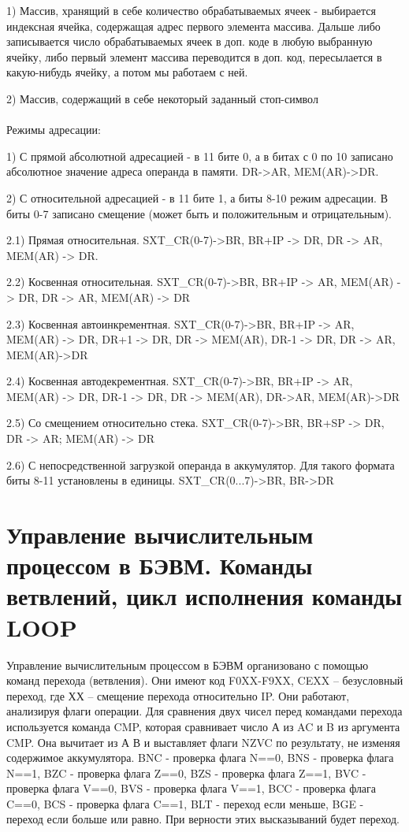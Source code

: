 \documentclass{article}
\begin{document}
1) Массив, хранящий в себе количество обрабатываемых ячеек - выбирается индексная ячейка,
содержащая адрес первого элемента массива. Дальше либо записывается число обрабатываемых
ячеек в доп. коде в любую выбранную ячейку, либо первый элемент массива переводится в доп.
код, пересылается в какую-нибудь ячейку, а потом мы работаем с ней.


2) Массив, содержащий в себе некоторый заданный стоп-символ\\ \\


Режимы адресации:


1) С прямой абсолютной адресацией  - в 11 бите 0, а в битах с 0 по 10 записано абсолютное значение адреса операнда в памяти. DR->AR, MEM(AR)->DR.


2) С относительной адресацией - в 11 бите 1, а биты 8-10 режим адресации. В биты 0-7 записано смещение (может быть и положительным и отрицательным).


2.1) Прямая относительная. SXT\_CR(0-7)->BR, BR+IP -> DR, DR -> AR, MEM(AR) -> DR.


2.2) Косвенная относительная. SXT\_CR(0-7)->BR, BR+IP -> AR, MEM(AR) -> DR, DR -> AR, MEM(AR) -> DR


2.3) Косвенная автоинкрементная. SXT\_CR(0-7)->BR, BR+IP -> AR, MEM(AR) -> DR, DR+1 -> DR, DR -> MEM(AR), DR-1 -> DR, DR -> AR, MEM(AR)->DR


2.4) Косвенная автодекрементная. SXT\_CR(0-7)->BR, BR+IP -> AR, MEM(AR) -> DR, DR-1 -> DR, DR -> MEM(AR), DR->AR, MEM(AR)->DR


2.5) Со смещением относительно стека. SXT\_CR(0-7)->BR, BR+SP -> DR, DR -> AR; MEM(AR) -> DR


2.6) С непосредственной загрузкой операнда в аккумулятор. Для такого формата биты 8-11 установлены в единицы. SXT\_CR(0...7)->BR, BR->DR


\section{Управление вычислительным процессом в БЭВМ. Команды ветвлений, цикл исполнения команды LOOP}
Управление вычислительным процессом в БЭВМ организовано с помощью команд перехода (ветвления). 
Они имеют код F0XX-F9XX, CEXX – безусловный переход, где ХХ – смещение перехода относительно IP. 
Они работают, анализируя флаги операции. Для сравнения двух чисел перед командами перехода используется команда CMP, 
которая сравнивает число А из AC и B из аргумента CMP. Она вычитает из А В и выставляет флаги NZVC по результату, 
не изменяя содержимое аккумулятора. BNC - проверка флага N==0, BNS - проверка флага N==1, BZC - проверка флага Z==0, BZS - проверка флага Z==1, BVC - проверка флага V==0, BVS - проверка флага V==1, BCC - проверка флага C==0, BCS - проверка флага C==1, BLT - переход если меньше, BGE - переход если больше или равно. При верности этих высказываний будет переход.
\end{document}
